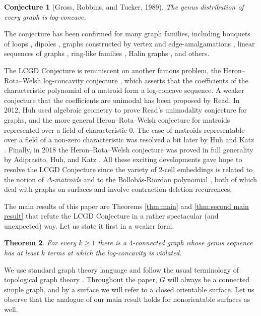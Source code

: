 \documentclass[11pt]{article}
\newtheorem{theorem}{Theorem}
\newtheorem{conjecture}[theorem]{Conjecture}
\begin{document}
\begin{conjecture}[Gross, Robbins, and Tucker, 1989]
\label{conj:LCGD}
  The genus distribution of every graph is log-concave.
\end{conjecture}

The conjecture has been confirmed for many graph families, including bouquets of loops \cite{GrRoTu89}, dipoles \cite{KwLee93,ViWi07}, graphs constructed by vertex and edge-amalgamations \cite{GMTW15}, linear sequences of graphs \cite{CGM15a,CGMT20a,CGMT20b}, ring-like families \cite{GMT14b,CGM15b}, Halin graphs \cite{GMT14b}, and others.

The LCGD Conjecture is reminiscent on another famous problem, the Heron–Rota–Welsh log-concavity conjecture \cite{Heron72,Rota71,Welsh71}, which asserts that the coefficients of the characteristic polynomial of a matroid form a log-concave sequence. A weaker conjecture that the coefficients are unimodal has been proposed by Read. In 2012, Huh used algebraic geometry to prove Read’s unimodality conjecture \cite{Huh12} for graphs, and the more general Heron–Rota–Welsh conjecture for matroids represented over a field of characteristic 0. The case of matroids representable over a field of a non-zero characteristic was resolved a bit later by Huh and Katz \cite{HuKa12}. Finally, in 2018 the Heron–Rota–Welsh conjecture was proved in full generality by Adiprasito, Huh, and Katz \cite{AHK18}. All these exciting developments gave hope to resolve the LCGD Conjecture since the variety of 2-cell embeddings is related to the notion of \emph{$\Delta$-matroids} \cite{Bo87,Bo89,Mo08,CMNR19} and to the Bollob\'as-Riordan polynomial \cite{BoRi01}, both of which deal with graphs on surfaces and involve contraction-deletion recurrences.

The main results of this paper are Theorems \ref{thm:main} and \ref{thm:second main result} that refute the LCGD Conjecture in a rather spectacular (and unexpected) way. Let us state it first in a weaker form.

\begin{theorem}
\label{thm:main weaker}
  For every $k\ge1$ there is a $4$-connected graph whose genus sequence has at least $k$ terms at which the log-concavity is violated.
\end{theorem}

We use standard graph theory language \cite{Di18} and follow the usual terminology of topological graph theory \cite{MT01}.
Throughout the paper, $G$ will always be a connected simple graph, and by a surface we will refer to a closed orientable surface. Let us observe that the analogue of our main result holds for nonorientable surfaces as well.
\end{document}

